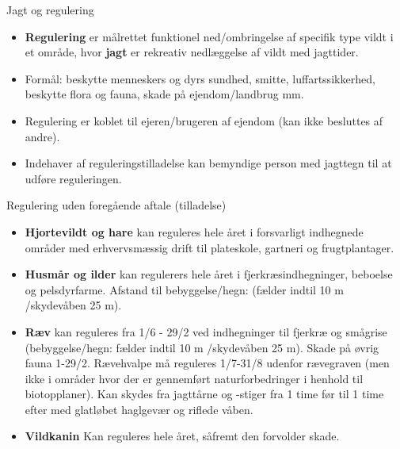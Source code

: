 \begin{frame}{Jagt og regulering}

\vspace{1em}

\small

\raggedright

\begin{itemize}

\itemsep0.6em %

\item \textbf{Regulering} er målrettet funktionel ned/ombringelse af specifik type vildt i et område, hvor \textbf{jagt} er rekreativ nedlæggelse af vildt med jagttider.

\item Formål: beskytte menneskers og dyrs sundhed, smitte, luffartssikkerhed, beskytte flora og fauna, skade på ejendom/landbrug mm.

\item Regulering er koblet til ejeren/brugeren af ejendom (kan ikke besluttes af andre).

\item Indehaver af reguleringstilladelse kan bemyndige person med jagttegn til at udføre reguleringen.

\end{itemize}

\end{frame}

\begin{frame}{Regulering uden foregående aftale (tilladelse)}

\vspace{1em}

\small

\raggedright

\begin{itemize}

\itemsep0.6em %

\item \textbf{Hjortevildt og hare} kan reguleres hele året i forsvarligt indhegnede områder med erhvervsmæssig drift til plateskole, gartneri og frugtplantager.

\item \textbf{Husmår og ilder} kan regulerers hele året i fjerkræsindhegninger, beboelse og pelsdyrfarme. Afstand til bebyggelse/hegn: (fælder indtil 10 m /skydevåben 25 m).

\item \textbf{Ræv} kan reguleres fra 1/6 - 29/2 ved indhegninger til fjerkræ og smågrise (bebyggelse/hegn: fælder indtil 10 m /skydevåben 25 m). Skade på øvrig fauna 1-29/2. Rævehvalpe må reguleres 1/7-31/8 udenfor rævegraven (men ikke i områder hvor der er gennemført naturforbedringer i henhold til biotopplaner). Kan skydes fra jagttårne og -stiger fra 1 time før til 1 time efter med glatløbet haglgevær og riflede våben. 

\item \textbf{Vildkanin} Kan reguleres hele året, såfremt den forvolder skade.

\end{itemize}

\end{frame}

